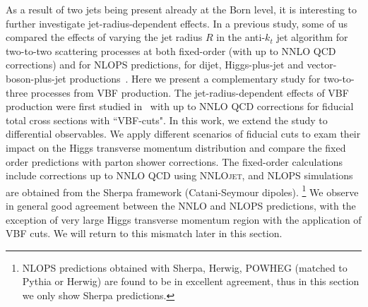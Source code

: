 \documentclass[10pt,prd,fleqn,superscriptaddress,notitlepage,nofootinbib,preprintnumbers,nobalancelastpage]{revtex4-1}
\newcommand{\NNLOJET}{\textsc{NNLOjet}\xspace}
\newcommand{\VBF}{VBF\xspace}
\begin{document}
As a result of two jets being present already at the Born level, it is interesting to further investigate jet-radius-dependent effects.
In a previous study, some of us compared the effects of varying the jet radius $R$ in the anti-$k_t$ jet algorithm for two-to-two scattering processes at both fixed-order (with up to NNLO QCD corrections) and for NLOPS predictions, for dijet, Higgs-plus-jet and vector-boson-plus-jet productions~\cite{Bellm:2019yyh}. Here we present a complementary study for two-to-three processes from \VBF production. The jet-radius-dependent effects of \VBF production were first studied in~\cite{Rauch:2017cfu} with up to NNLO QCD corrections for fiducial total cross sections with ``VBF-cuts". In this work, we extend the study to differential observables. We apply different scenarios of fiducial cuts to exam their impact on the Higgs transverse momentum distribution and compare the fixed order predictions with parton shower corrections.
The fixed-order calculations include corrections up to NNLO QCD  using \NNLOJET, and NLOPS simulations are obtained from the Sherpa framework (Catani-Seymour dipoles).%
\footnote{NLOPS predictions obtained with Sherpa, Herwig, POWHEG (matched to Pythia or Herwig) are found to be in excellent agreement, thus in this section we only show Sherpa predictions.}
We observe in general good agreement between  the NNLO and NLOPS predictions,  with the exception of very large Higgs transverse momentum region with the application of VBF cuts. We will return to this mismatch later in this section.
\end{document}
